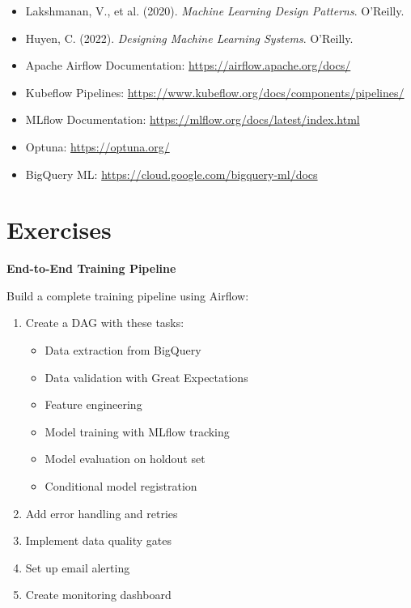 \begin{itemize}
    \item Lakshmanan, V., et al. (2020). \textit{Machine Learning Design Patterns}. O'Reilly.
    \item Huyen, C. (2022). \textit{Designing Machine Learning Systems}. O'Reilly.
    \item Apache Airflow Documentation: \url{https://airflow.apache.org/docs/}
    \item Kubeflow Pipelines: \url{https://www.kubeflow.org/docs/components/pipelines/}
    \item MLflow Documentation: \url{https://mlflow.org/docs/latest/index.html}
    \item Optuna: \url{https://optuna.org/}
    \item BigQuery ML: \url{https://cloud.google.com/bigquery-ml/docs}
\end{itemize}

\section{Exercises}

\begin{exercise}
\textbf{End-to-End Training Pipeline}

Build a complete training pipeline using Airflow:

\begin{enumerate}
    \item Create a DAG with these tasks:
    \begin{itemize}
        \item Data extraction from BigQuery
        \item Data validation with Great Expectations
        \item Feature engineering
        \item Model training with MLflow tracking
        \item Model evaluation on holdout set
        \item Conditional model registration
    \end{itemize}
    \item Add error handling and retries
    \item Implement data quality gates
    \item Set up email alerting
    \item Create monitoring dashboard
\end{enumerate}
\end{exercise}

